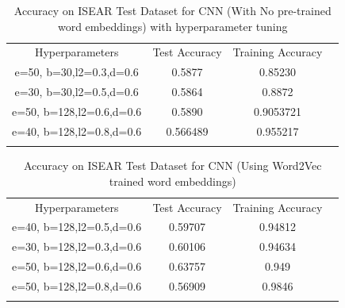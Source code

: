 \documentclass[conference]{IEEEtran}
\numberwithin{equation}{section}
\numberwithin{figure}{section}
\numberwithin{table}{section}
\begin{document}
\begin{table}[!htb]
 \centering
 \caption{Accuracy on ISEAR Test Dataset for CNN (With No pre-trained word embeddings) with hyperparameter tuning}
 \label{tab_cnn}
\begin{tabular}{ c c c c } 
    \noalign{\smallskip}\hline\noalign{\smallskip}
	Hyperparameters & Test Accuracy & Training Accuracy \\
       \noalign{\smallskip}\hline\noalign{\smallskip}
	e=50, b=30,l2=0.3,d=0.6  & 0.5877 & 0.85230\\
	e=30, b=30,l2=0.5,d=0.6  & 0.5864 & 0.8872\\
	e=50, b=128,l2=0.6,d=0.6  & 0.5890 & 0.9053721\\
	e=40, b=128,l2=0.8,d=0.6  & 0.566489 & 0.955217\\
    \noalign{\smallskip}\hline
  \end{tabular} 
\end{table}

\begin{table}[!htb]
 \centering
 \caption{Accuracy on ISEAR Test Dataset for CNN (Using Word2Vec trained word embeddings)}
 \label{tab_cnn2}
\begin{tabular}{ c c c c } 
    \noalign{\smallskip}\hline\noalign{\smallskip}
	Hyperparameters & Test Accuracy & Training Accuracy \\
       \noalign{\smallskip}\hline\noalign{\smallskip}
	e=40, b=128,l2=0.5,d=0.6  & 0.59707 & 0.94812\\
	e=30, b=128,l2=0.3,d=0.6  & 0.60106 & 0.94634\\
	e=50, b=128,l2=0.6,d=0.6  & 0.63757 & 0.949\\
	e=50, b=128,l2=0.8,d=0.6  & 0.56909 & 0.9846\\
    \noalign{\smallskip}\hline
  \end{tabular} 
\end{table}
\end{document}
